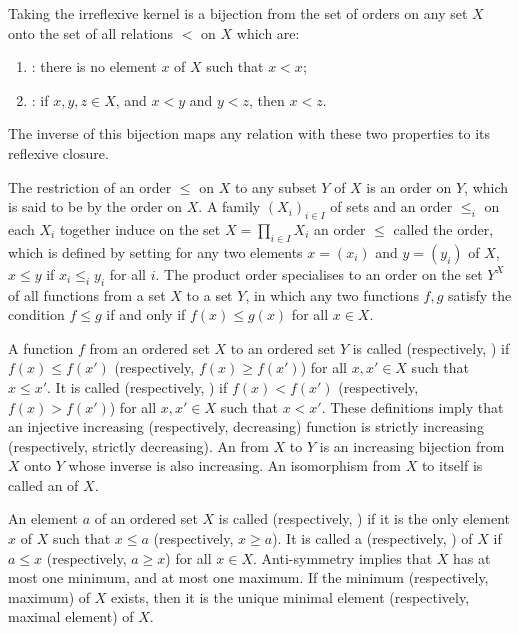 \documentclass{article}
\begin{document}
Taking the irreflexive kernel is a bijection from the set of orders on
any set \(X\) onto the set of all relations \(<\) on \(X\) which are:
\begin{enumerate}
\item {}: there is no element \(x\) of \(X\) such
  that \(x < x\);
\item {}: if \(x,y,z \in X\), and \(x < y\) and
  \(y < z\), then \(x < z\).
\end{enumerate}
The inverse of this bijection maps any relation with these two
properties to its reflexive closure.

The restriction of an order \(\leq\) on \(X\) to any subset \(Y\) of
\(X\) is an order on \(Y\), which is said to be  by
the order on \(X\).  A family \((X_i)_{i \in I}\) of sets and an order
\(\leq_i\) on each \(X_i\) together induce on the set
\(X = \prod_{i \in I}X_i\) an order \(\leq\) called the
 order, which is defined by setting for any two
elements \(x= (x_i)\) and \(y = (y_i)\) of \(X\), \(x \leq y\) if
\(x_i \leq_i y_i\) for all \(i\).  The product order specialises to an
order on the set \(Y^X\) of all functions from a set \(X\) to a set
\(Y\), in which any two functions \(f,g\) satisfy the condition
\(f \leq g\) if and only if \(f(x) \leq g(x)\) for all \(x \in X\).

A function \(f\) from an ordered set \(X\) to an ordered set \(Y\) is
called  (respectively, )
if \(f(x) \leq f(x')\) (respectively, \(f(x) \geq f(x')\)) for all
\(x, x' \in X\) such that \(x \leq x'\).  It is called
 (respectively, ) if \(f(x) < f(x')\) (respectively, \(f(x) > f(x')\))
for all \(x, x' \in X\) such that \(x < x'\).  These definitions imply
that an injective increasing (respectively, decreasing) function is
strictly increasing (respectively, strictly decreasing).  An
 from \(X\) to \(Y\) is an increasing bijection
from \(X\) onto \(Y\) whose inverse is also increasing.  An
isomorphism from \(X\) to itself is called an 
of \(X\).

An element \(a\) of an ordered set \(X\) is called 
(respectively, ) if it is the only element \(x\) of
\(X\) such that \(x \leq a\) (respectively, \(x \geq a\)).  It is
called a  (respectively, ) of
\(X\) if \(a \leq x\) (respectively, \(a \geq x\)) for all
\(x \in X\).  Anti-symmetry implies that \(X\) has at most one
minimum, and at most one maximum.  If the minimum (respectively,
maximum) of \(X\) exists, then it is the unique minimal element
(respectively, maximal element) of \(X\).
\end{document}

